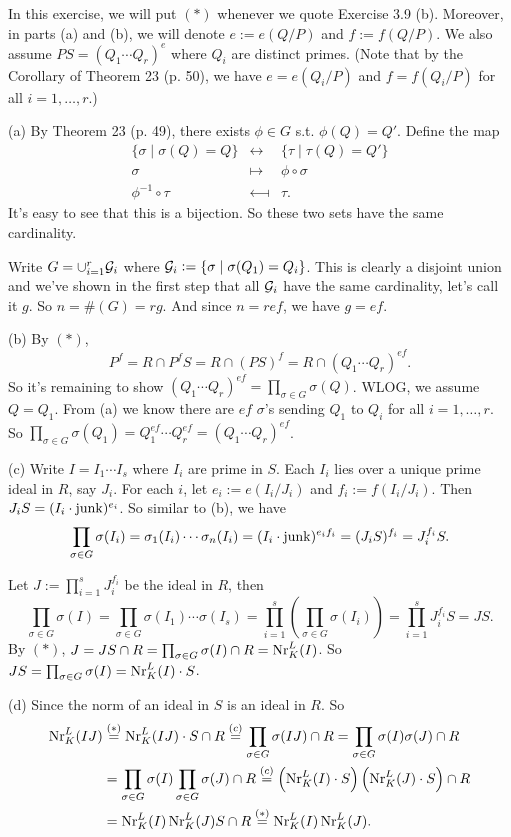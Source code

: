 \documentclass[../Marcus.tex]{subfiles}
\begin{document}
In this exercise, we will put $(*)$ whenever we quote Exercise 3.9 (b). Moreover, in parts (a) and (b), we will denote $e:=e(Q/P)$ and $f:=f(Q/P)$. We also assume $PS=(Q_1\cdots Q_r)^e$ where $Q_i$ are distinct primes. (Note that by the Corollary of Theorem 23 (p. 50), we have $e=e(Q_i/P)$ and $f=f(Q_i/P)$ for all $i=1,\ldots,r$.)

(a) By Theorem 23 (p. 49), there exists $\phi\in G$ s.t. $\phi(Q)=Q'$. Define the map
$$
\begin{array}{ccc}
    \{\sigma\mid \sigma(Q)=Q\} & \longleftrightarrow & \{\tau\mid \tau(Q)=Q'\} \\
    \sigma & \longmapsto & \phi\circ\sigma \\
    \phi^{-1}\circ\tau & \longmapsfrom & \tau.
    \end{array}
$$
It's easy to see that this is a bijection. So these two sets have the same cardinality.

Write $G=\cup_{i=1}^r \mathcal{G}_i$ where $\mathcal{G}_i:=\{\sigma\mid \sigma(Q_1)=Q_i\}$. This is clearly a disjoint union and we've shown in the first step that all $\mathcal{G}_i$ have the same cardinality, let's call it $g$. So $n=\#(G)=rg$. And since $n=ref$, we have $g=ef$.

(b) By $(*)$,
$$
P^f=R\cap P^fS=R\cap(PS)^f=R\cap(Q_1\cdots Q_r)^{ef}.
$$
So it's remaining to show $(Q_1\cdots Q_r)^{ef}=\prod_{\sigma\in G}\sigma(Q)$. WLOG, we assume $Q=Q_1$. From (a) we know there are $ef$ $\sigma$'s sending $Q_1$ to $Q_i$ for all $i=1,\ldots,r$. So $\prod_{\sigma\in G}\sigma(Q_1)=Q_1^{ef}\cdots Q_r^{ef}=(Q_1\cdots Q_r)^{ef}$.

(c) Write $I=I_1\cdots I_s$ where $I_i$ are prime in $S$. Each $I_i$ lies over a unique prime ideal in $R$, say $J_i$. For each $i$, let $e_i:=e(I_i/J_i)$ and $f_i:=f(I_i/J_i)$. Then $J_iS=(I_i\cdot\operatorname{junk})^{e_i}$. So similar to (b), we have 
$$
\prod_{\sigma\in G}\sigma(I_i)
= \sigma_1(I_i)\cdots\sigma_n(I_i)
= (I_i\cdot\operatorname{junk})^{e_if_i}
= (J_iS)^{f_i}=J_i^{f_i}S.
$$

Let $J:=\prod_{i=1}^s J_i^{f_i}$ be the ideal in $R$, then
$$
\prod_{\sigma\in G}\sigma(I)
= \prod_{\sigma\in G}\sigma(I_1)\cdots\sigma(I_s)
= \prod_{i=1}^s\left(\prod_{\sigma\in G}\sigma(I_i)\right)
= \prod_{i=1}^s J_i^{f_i}S=JS.
$$
By $(*)$, $J=JS\cap R=\prod_{\sigma\in G}\sigma(I)\cap R=\operatorname{Nr}^L_K(I)$. So $JS=\prod_{\sigma\in G}\sigma(I)=\operatorname{Nr}^L_K(I)\cdot S$.

(d) Since the norm of an ideal in $S$ is an ideal in $R$. So
\begin{align*}
    \operatorname{Nr}^L_K(IJ)
	&\overset{(*)}{=} \operatorname{Nr}^L_K(IJ)\cdot S\cap R
	\overset{(c)}{=} \prod_{\sigma\in G}\sigma(IJ)\cap R
	= \prod_{\sigma\in G}\sigma(I)\sigma(J)\cap R   \\
    &= \prod_{\sigma\in G}\sigma(I)\prod_{\sigma\in G}\sigma(J)\cap R
	\overset{(c)}{=} \left(\operatorname{Nr}^L_K(I)\cdot S\right)\left(\operatorname{Nr}^L_K(J)\cdot S\right)\cap R   \\
    &= \operatorname{Nr}^L_K(I)\operatorname{Nr}^L_K(J)S\cap R
	\overset{(*)}{=} \operatorname{Nr}^L_K(I)\operatorname{Nr}^L_K(J).
\end{align*}
\end{document}
